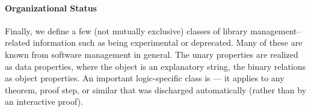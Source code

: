 \paragraph{Organizational Status}
Finally, we define a few (not mutually exclusive) classes of library management--related information such as being experimental or deprecated.
Many of these are known from software management in general.
The unary properties are realized as data properties, where the object is an explanatory string, the binary relations as object properties. 
An important logic-specific class is  --- it applies to any theorem, proof step, or similar that was discharged automatically (rather than by an interactive proof).


